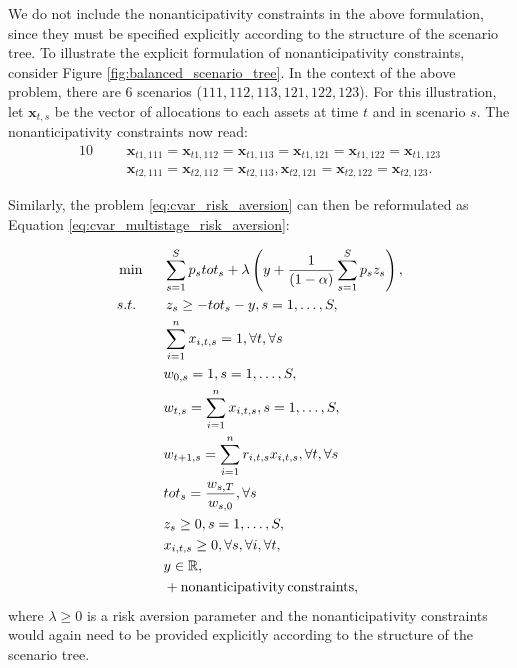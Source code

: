 \begin{rem}
We do not include the nonanticipativity constraints in the above formulation, since they must be specified explicitly according to the structure of the scenario tree. To illustrate the explicit formulation of nonanticipativity constraints, consider Figure \ref{fig:balanced_scenario_tree}. In the context of the above problem, there are 6 scenarios ($111, 112, 113, 121, 122, 123$). For this illustration, let $\mathbf{x}_{t,s}$ be the vector of allocations to each assets at time $t$ and in scenario $s$. The nonanticipativity constraints now read:
\begin{alignat}{10}
& && \mathbf{x}_{t1,111}=\mathbf{x}_{t1,112}=\mathbf{x}_{t1,113}=\mathbf{x}_{t1,121}=\mathbf{x}_{t1,122}=\mathbf{x}_{t1,123} \nonumber \\
& && \mathbf{x}_{t2,111}=\mathbf{x}_{t2,112}=\mathbf{x}_{t2,113},\mathbf{x}_{t2,121}=\mathbf{x}_{t2,122}=\mathbf{x}_{t2,123}. \nonumber
\end{alignat}
\end{rem}

Similarly, the problem \ref{eq:cvar_risk_aversion} can then be reformulated as Equation \ref{eq:cvar_multistage_risk_aversion}:

\begin{alignat}{10}
& \min  \, \, \, &&\sum_{s=1}^{S} p_s tot_s + \lambda \left( y + \frac{1}{(1-\alpha)} \sum_{s=1}^S p_s z_s \right), \label{eq:cvar_multistage_risk_aversion}  \\
&s.t. && \, z_s \geq  -tot_s -y, s=1,\dots,S, \nonumber \\
&  && \sum_{i=1}^{n} x_{i,t,s} = 1, \forall t, \forall s \nonumber \\
& && w_{0,s}=1, s=1,\dots,S, \nonumber \\
& && w_{t,s}=\sum_{i=1}^{n} x_{i,t,s}, s=1,\dots,S, \label{eq:cvar_multistage_expected_return:wealth_distribution} \\
& && w_{t+1,s}=\sum_{i=1}^{n} r_{i,t,s} x_{i,t,s}, \forall t, \forall s \label{eq:cvar_multistage_expected_return:wealth_increases} \\
& && tot_s = \frac{w_{s,T}}{w_{s,0}},\forall s \nonumber \\
& && z_s \geq 0, s=1,\dots,S, \nonumber \\
& && x_{i,t,s} \geq 0, \forall s, \forall i, \forall t, \nonumber \\
& && y \in \R ,\nonumber \\
& && + \mathrm{nonanticipativity \, constraints}, \nonumber
\end{alignat}
where $\lambda \geq 0$ is a risk aversion parameter and the nonanticipativity constraints would again need to be provided explicitly according to the structure of the scenario tree.